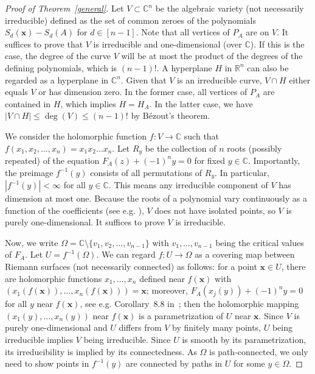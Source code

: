 \documentclass[11pt]{article}
\theoremstyle{definition}
\begin{document}
\begin{proof}[Proof of Theorem~\ref{general}]

  Let $V \subset \mathbb{C}^n$ be the algebraic variety (not necessarily irreducible) defined as the set of common zeroes of the polynomials $S_d(\textbf{x}) - S_d(A)$ for $d \in [n-1]$. Note that all vertices of $P_A$ are on $V$. It suffices to prove that $V$ is irreducible and one-dimensional (over $\mathbb{C}$). If this is the case, the degree of the curve $V$ will be at most the product of the degrees of the defining polynomials, which is $(n-1)!$. A hyperplane $H$ in $\mathbb{R}^n$ can also be regarded as a hyperplane in $\mathbb{C}^n$. Given that $V$ is an irreducible curve, $V \cap H$ either equals $V$ or has dimension zero. In the former case, all vertices of $P_A$ are contained in $H$, which implies $H = H_A$. In the latter case, we have $|V \cap H| \leq \deg(V)\leq (n-1)!$ by B\'ezout's theorem.

  We consider the holomorphic function $f: V \to \mathbb{C}$ such that $f(x_1,x_2,\dots,x_n) = x_1x_2\dots x_n$. Let $R_y$ be the collection of $n$ roots (possibly repeated) of the equation $F_A(z) + (-1)^{n} y = 0$ for fixed $y \in \mathbb{C}$. Importantly, the preimage $f^{-1}(y)$ consists of all permutations of $R_y$. In particular, $|f^{-1}(y)| < \infty$ for all $y \in \mathbb{C}$. This means any irreducible component of $V$ has dimension at most one. Because the roots of a polynomial vary continuously as a function of the coefficients (see e.g. \cite{harris1987shorter}), $V$ does not have isolated points, so $V$ is purely one-dimensional. It suffices to prove $V$ is irreducible.

  Now, we write $\Omega = \mathbb{C} \setminus \{v_1,v_2,\dots,v_{n-1}\}$ with $v_1,\dots,v_{n-1}$ being the critical values of $F_A$. Let $U = f^{-1}(\Omega)$. We can regard $f: U \to \Omega$ as a covering map between Riemann surfaces (not necessarily connected) as follows: for a point $\textbf{x} \in U$, there are holomorphic functions $x_1,\dots,x_n$ defined near $f(\textbf{x})$ with $(x_1(f(\textbf{x})),\dots, x_n(f(\textbf{x}))) = \textbf{x}$; moreover, $F_A(x_j(y)) + (-1)^n y = 0$ for all $y$ near $f(\textbf{x})$, see e.g. Corollary~8.8 in~\cite{forster1981lectures}; then the holomorphic mapping $(x_1(y),\dots,x_n(y))$ near $f(\textbf{x})$ is a parametrization of $U$ near $\textbf{x}$. Since $V$ is purely one-dimensional and $U$ differs from $V$ by finitely many points, $U$ being irreducible implies $V$ being irreducible. Since $U$ is smooth by its parametrization, its irreducibility is implied by its connectedness. As $\Omega$ is path-connected, we only need to show points in $f^{-1}(y)$ are connected by paths in $U$ for some $y \in \Omega$.


\end{proof}
\end{document}
